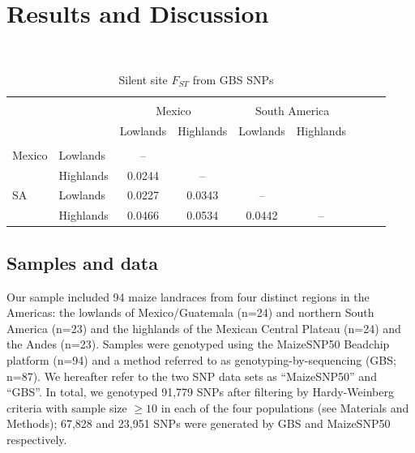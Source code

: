 \section*{Results and Discussion}

\renewcommand{\arraystretch}{1.1}
\begin{table}[tb]

\begin{center}
 \caption[]{Silent site $F_{ST}$ from GBS SNPs \hspace*{2.3cm}}
  \textbf{}\\[-2mm]
{\fontsize{7}{9}\sf
    \begin{tabular}{llccccccl}
    \hline
    & & \\[-3mm]
	&		&	\multicolumn{2}{c}{Mexico}		&	\multicolumn{2}{c}{South America}		\\
	&		&	Lowlands	&	Highlands	&	Lowlands	&	Highlands	\\
      \hline
    & & \\[-3mm]
Mexico	&	Lowlands	&	--	&		&		&		\\
	&	Highlands	&	0.0244	&	--	&		&		\\
SA	&	Lowlands	&	0.0227	&	0.0343	&	--	&		\\
	&	Highlands	&	0.0466	&	0.0534	&	0.0442	&	--	\\ [1mm]
    \hline
    \end{tabular}
    \label{FstP}  %
}
\end{center}
\end{table}
\renewcommand{\arraystretch}{1}

\subsection*{Samples and data}

Our sample included 94 maize landraces from four distinct regions in the Americas: the lowlands of Mexico/Guatemala (n=24) and northern South America (n=23) and the highlands of the Mexican Central Plateau (n=24) and the Andes (n=23). Samples were genotyped using the MaizeSNP50 Beadchip platform (n=94) and a method referred to as genotyping-by-sequencing (GBS; n=87). 
We hereafter refer to the two SNP data sets as ``MaizeSNP50'' and ``GBS''.
In total, we genotyped 91,779 SNPs after filtering by Hardy-Weinberg criteria with sample size $\geq10$ in each of the four populations (see Materials and Methods); 67,828 and 23,951 SNPs were generated by GBS and MaizeSNP50 respectively.  

